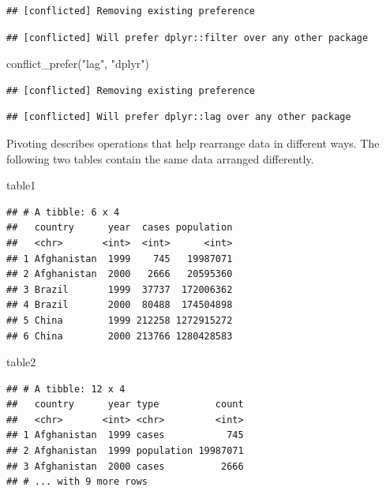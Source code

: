 \documentclass[]{book}
\newenvironment{Shaded}{}{}
\newcommand{\KeywordTok}[1]{\textcolor[rgb]{0.00,0.00,1.00}{#1}}
\newcommand{\NormalTok}[1]{#1}
\newcommand{\StringTok}[1]{\textcolor[rgb]{0.00,0.50,0.50}{#1}}
\begin{document}
\begin{verbatim}
## [conflicted] Removing existing preference
\end{verbatim}

\begin{verbatim}
## [conflicted] Will prefer dplyr::filter over any other package
\end{verbatim}

\begin{Shaded}
\begin{Highlighting}[]
\KeywordTok{conflict_prefer}\NormalTok{(}\StringTok{"lag"}\NormalTok{, }\StringTok{"dplyr"}\NormalTok{)}
\end{Highlighting}
\end{Shaded}

\begin{verbatim}
## [conflicted] Removing existing preference
\end{verbatim}

\begin{verbatim}
## [conflicted] Will prefer dplyr::lag over any other package
\end{verbatim}

Pivoting describes operations that help rearrange data in different ways.
The following two tables contain the same data arranged differently.

\begin{Shaded}
\begin{Highlighting}[]
\NormalTok{table1}
\end{Highlighting}
\end{Shaded}

\begin{verbatim}
## # A tibble: 6 x 4
##   country      year  cases population
##   <chr>       <int>  <int>      <int>
## 1 Afghanistan  1999    745   19987071
## 2 Afghanistan  2000   2666   20595360
## 3 Brazil       1999  37737  172006362
## 4 Brazil       2000  80488  174504898
## 5 China        1999 212258 1272915272
## 6 China        2000 213766 1280428583
\end{verbatim}

\begin{Shaded}
\begin{Highlighting}[]
\NormalTok{table2}
\end{Highlighting}
\end{Shaded}

\begin{verbatim}
## # A tibble: 12 x 4
##   country      year type          count
##   <chr>       <int> <chr>         <int>
## 1 Afghanistan  1999 cases           745
## 2 Afghanistan  1999 population 19987071
## 3 Afghanistan  2000 cases          2666
## # ... with 9 more rows
\end{verbatim}
\end{document}
